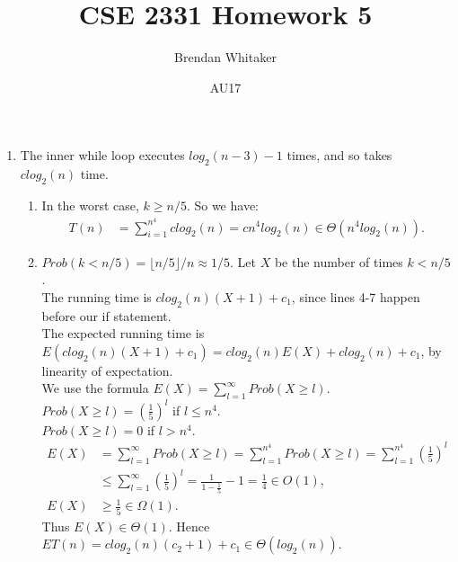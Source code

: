\documentclass[10pt,oneside,reqno]{amsart}
\theoremstyle{plain}
\theoremstyle{definition}
\begin{document}
\title{CSE 2331 Homework 5}

\date{AU17}

\author[Brendan Whitaker]{Brendan Whitaker}

\maketitle

\begin{enumerate}[label=\arabic*.]

\item 
The inner while loop executes $log_2(n - 3) - 1$ times, and so takes $clog_2(n)$ time. 
\begin{enumerate}
\item In the worst case, $k\geq n/5$. So we have:
\begin{equation}
\begin{aligned}
T(n) &= \sum_{i = 1}^{n^4}clog_2(n) = cn^4log_2(n) \in \Theta(n^4log_2(n)). 
\end{aligned}
\end{equation}
\item $Prob(k < n/5) = \lfloor n/5 \rfloor / n \approx 1/5$. Let $X$ be the number of times $k<n/5$. \\
The running time is $clog_2(n)(X + 1) + c_1$, since lines 4-7 happen before our if statement. \\
The expected running time is $E(clog_2(n)(X + 1) + c_1) = clog_2(n)E(X) + clog_2(n) + c_1$, by linearity of expectation. \\
We use the formula $E(X) = \sum_{l = 1}^\infty Prob(X \geq l)$. \\
$Prob(X \geq l) = \left(\frac{1}{5}\right)^{l}$ if $l \leq n^4$. \\
$Prob(X \geq l) = 0$ if $l > n^4$. 
\begin{equation}
\begin{aligned}
E(X) &= \sum_{l = 1}^\infty Prob(X \geq l) = \sum_{l = 1}^{n^4} Prob(X \geq l) = \sum_{l = 1}^{n^4} \left(\frac{1}{5}\right)^{l}\\
&\leq \sum_{l = 1}^{\infty} \left(\frac{1}{5}\right)^{l} = \frac{1}{1 - \frac{1}{5}} - 1 = \frac{1}{4} \in O(1),\\
E(X) &\geq \frac{1}{5} \in \Omega(1). 
\end{aligned}
\end{equation}
Thus $E(X) \in \Theta(1)$. Hence $ET(n) = clog_2(n)(c_2 + 1 )+ c_1 \in \Theta(log_2(n))$. \\
\end{enumerate}


\end{enumerate}
\end{document}
